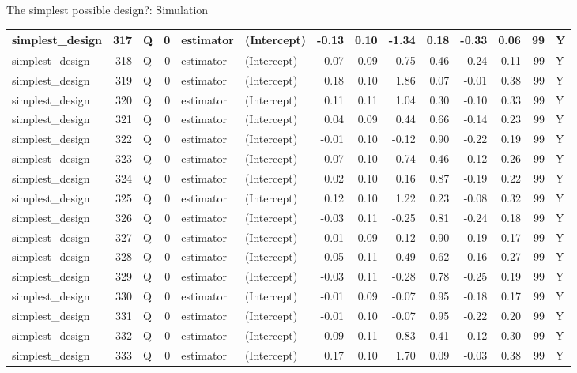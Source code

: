 \documentclass[
  11pt,
  ignorenonframetext,
]{beamer}
\begin{document}
\begin{frame}[fragile]{The simplest possible design?: Simulation}
\begin{tabular}{l|r|l|r|l|l|r|r|r|r|r|r|r|l}
\hline
simplest\_design & 317 & Q & 0 & estimator & (Intercept) & -0.13 & 0.10 & -1.34 & 0.18 & -0.33 & 0.06 & 99 & Y\\
\hline
simplest\_design & 318 & Q & 0 & estimator & (Intercept) & -0.07 & 0.09 & -0.75 & 0.46 & -0.24 & 0.11 & 99 & Y\\
\hline
simplest\_design & 319 & Q & 0 & estimator & (Intercept) & 0.18 & 0.10 & 1.86 & 0.07 & -0.01 & 0.38 & 99 & Y\\
\hline
simplest\_design & 320 & Q & 0 & estimator & (Intercept) & 0.11 & 0.11 & 1.04 & 0.30 & -0.10 & 0.33 & 99 & Y\\
\hline
simplest\_design & 321 & Q & 0 & estimator & (Intercept) & 0.04 & 0.09 & 0.44 & 0.66 & -0.14 & 0.23 & 99 & Y\\
\hline
simplest\_design & 322 & Q & 0 & estimator & (Intercept) & -0.01 & 0.10 & -0.12 & 0.90 & -0.22 & 0.19 & 99 & Y\\
\hline
simplest\_design & 323 & Q & 0 & estimator & (Intercept) & 0.07 & 0.10 & 0.74 & 0.46 & -0.12 & 0.26 & 99 & Y\\
\hline
simplest\_design & 324 & Q & 0 & estimator & (Intercept) & 0.02 & 0.10 & 0.16 & 0.87 & -0.19 & 0.22 & 99 & Y\\
\hline
simplest\_design & 325 & Q & 0 & estimator & (Intercept) & 0.12 & 0.10 & 1.22 & 0.23 & -0.08 & 0.32 & 99 & Y\\
\hline
simplest\_design & 326 & Q & 0 & estimator & (Intercept) & -0.03 & 0.11 & -0.25 & 0.81 & -0.24 & 0.18 & 99 & Y\\
\hline
simplest\_design & 327 & Q & 0 & estimator & (Intercept) & -0.01 & 0.09 & -0.12 & 0.90 & -0.19 & 0.17 & 99 & Y\\
\hline
simplest\_design & 328 & Q & 0 & estimator & (Intercept) & 0.05 & 0.11 & 0.49 & 0.62 & -0.16 & 0.27 & 99 & Y\\
\hline
simplest\_design & 329 & Q & 0 & estimator & (Intercept) & -0.03 & 0.11 & -0.28 & 0.78 & -0.25 & 0.19 & 99 & Y\\
\hline
simplest\_design & 330 & Q & 0 & estimator & (Intercept) & -0.01 & 0.09 & -0.07 & 0.95 & -0.18 & 0.17 & 99 & Y\\
\hline
simplest\_design & 331 & Q & 0 & estimator & (Intercept) & -0.01 & 0.10 & -0.07 & 0.95 & -0.22 & 0.20 & 99 & Y\\
\hline
simplest\_design & 332 & Q & 0 & estimator & (Intercept) & 0.09 & 0.11 & 0.83 & 0.41 & -0.12 & 0.30 & 99 & Y\\
\hline
simplest\_design & 333 & Q & 0 & estimator & (Intercept) & 0.17 & 0.10 & 1.70 & 0.09 & -0.03 & 0.38 & 99 & Y\\

\end{tabular}
\end{frame}
\end{document}
